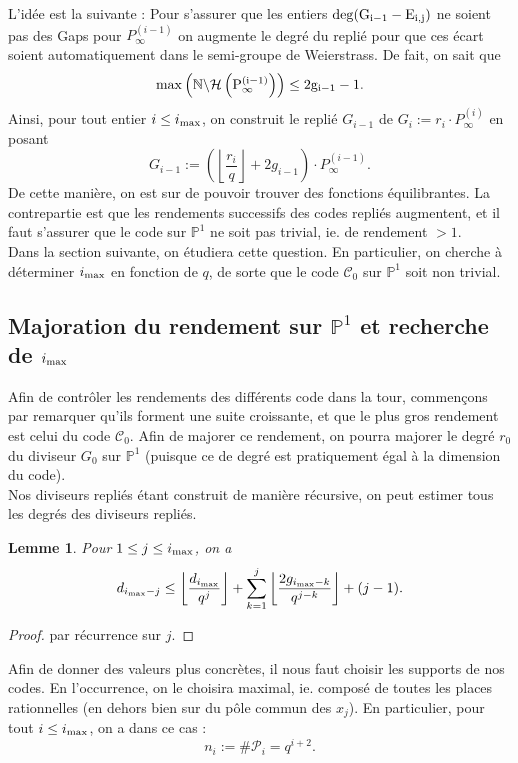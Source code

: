 \documentclass[10pt]{article}
\newtheorem{lem1}{Lemme}[]
\newcommand{\s}{\vspace{0.3cm}}
\newcommand{\cd}{\cdot}
\newcommand{\N}{\mathbb{N}}
\newcommand{\PR}{\mathcal{P}}
\newcommand{\ii}{i_{\rm{max}}}
\begin{document}
L'idée est la suivante : Pour s'assurer que les entiers $\rm{deg}(G_{i-1}-E_{i,j})$ ne soient pas des Gaps pour $P_{\infty}^{(i-1)}$ on augmente le degré du replié pour que ces écart soient automatiquement dans le semi-groupe de Weierstrass. De fait, on sait que 
\[\rm{max}\left(\N \backslash \mathcal{H}\left(P^{(i-1)}_{\infty}\right)\right) \leq 2g_{i-1} -1.\]
Ainsi, pour tout entier $i \leq \ii$, on construit le replié $G_{i-1}$ de $G_i := r_i \cd P^{(i)}_{\infty}$ en posant 
\[G_{i-1} := \left(\left\lfloor \dfrac{r_i}{q} \right\rfloor + 2g_{i-1}\right) \cd P^{(i-1)}_{\infty}.\]
De cette manière, on est sur de pouvoir trouver des fonctions équilibrantes. La contrepartie est que les rendements successifs des codes repliés augmentent, et il faut s'assurer que le code sur $\mathbb{P}^1$ ne soit pas trivial, ie. de rendement $> 1$. \\
Dans la section suivante, on étudiera cette question. En particulier, on cherche à déterminer $\ii$ en fonction de $q$, de sorte que le code $\mathcal{C}_0$ sur $\mathbb{P}^1$ soit non trivial.

\newpage

\subsection{Majoration du rendement sur $\mathbb{P}^1$ et recherche de $\ii$}

\s

Afin de contrôler les rendements des différents code dans la tour, commençons par remarquer qu'ils forment une suite croissante, et que le plus gros rendement est celui du code $\mathcal{C}_0$. Afin de majorer ce rendement, on pourra majorer le degré $r_0$ du diviseur $G_0$ sur $\mathbb{P}^1$ (puisque ce de degré est pratiquement égal à la dimension du code). \\
Nos diviseurs repliés étant construit de manière récursive, on peut estimer tous les degrés des diviseurs repliés.

\begin{lem1}
Pour $1 \leq j \leq \ii$, on a 
\[d_{\ii -j} \leq \left\lfloor \dfrac{d_{\ii}}{q^j}\right\rfloor + \sum\limits_{k=1}^j \left\lfloor \dfrac{2g_{\ii -k}}{q^{j-k}}\right\rfloor + (j-1).\]
\end{lem1}

\begin{proof}
par récurrence sur $j$.
\end{proof}

Afin de donner des valeurs plus concrètes, il nous faut choisir les supports de nos codes. En l'occurrence, on le choisira maximal, ie. composé de toutes les places rationnelles (en dehors bien sur du pôle commun des $x_j$). En particulier, pour tout $i \leq \ii$, on a dans ce cas :
\[n_i := \#\PR_i = q^{i+2}.\]
\end{document}

